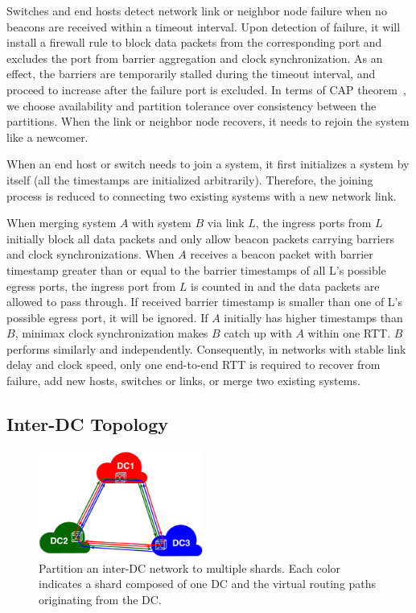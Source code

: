 Switches and end hosts detect network link or neighbor node failure when no beacons are received within a timeout interval.
Upon detection of failure, it will install a firewall rule to block data packets from the corresponding port and excludes the port from barrier aggregation and clock synchronization.
As an effect, the barriers are temporarily stalled during the timeout interval, and proceed to increase after the failure port is excluded.
In terms of CAP theorem~\cite{brewer2000towards}, we choose availability and partition tolerance over consistency between the partitions.
When the link or neighbor node recovers, it needs to rejoin the \sys system like a newcomer.

When an end host or switch needs to join a \sys system, it first initializes a \sys system by itself (all the timestamps are initialized arbitrarily). Therefore, the joining process is reduced to connecting two existing \sys systems with a new network link.

When merging \sys system $A$ with system $B$ via link $L$, the ingress ports from $L$ initially block all data packets and only allow beacon packets carrying barriers and clock synchronizations. 
When $A$ receives a beacon packet with barrier timestamp greater than or equal to the barrier timestamps of all L's possible egress ports, the ingress port from $L$ is counted in and the data packets are allowed to pass through.
If received barrier timestamp is smaller than one of L's possible egress port, it will be ignored.
If $A$ initially has higher timestamps than $B$, minimax clock synchronization makes $B$ catch up with $A$ within one RTT.
$B$ performs similarly and independently.
Consequently, in networks with stable link delay and clock speed, only one end-to-end RTT is required to recover from failure, add new hosts, switches or links, or merge two existing \sys systems.

\iffalse
\subsection{Inter-DC Topology}
\label{sec:inter-dc}


\begin{figure}[t]
\centering
\includegraphics[width=0.48\textwidth]{images/inter-DC.pdf}
\caption{Partition an inter-DC network to multiple shards. Each color indicates a shard composed of one DC and the virtual routing paths originating from the DC.}
\label{fig:inter-dc}
\end{figure}



